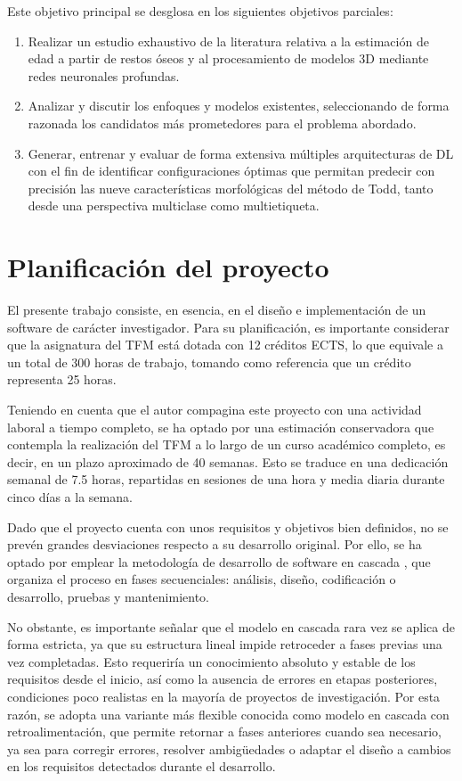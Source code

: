 Este objetivo principal se desglosa en los siguientes objetivos parciales:

\begin{enumerate}
    \item Realizar un estudio exhaustivo de la literatura relativa a la estimación de edad a partir de restos óseos y al procesamiento de modelos 3D mediante redes neuronales profundas.
    \item Analizar y discutir los enfoques y modelos existentes, seleccionando de forma razonada los candidatos más prometedores para el problema abordado.
    \item Generar, entrenar y evaluar de forma extensiva múltiples arquitecturas de DL con el fin de identificar configuraciones óptimas que permitan predecir con precisión las nueve características morfológicas del método de Todd, tanto desde una perspectiva multiclase como multietiqueta.
\end{enumerate}

\section{Planificación del proyecto}

El presente trabajo consiste, en esencia, en el diseño e implementación de un software de carácter investigador. Para su planificación, es importante considerar que la asignatura del TFM está dotada con 12 créditos ECTS, lo que equivale a un total de 300 horas de trabajo, tomando como referencia que un crédito representa 25 horas.

Teniendo en cuenta que el autor compagina este proyecto con una actividad laboral a tiempo completo, se ha optado por una estimación conservadora que contempla la realización del TFM a lo largo de un curso académico completo, es decir, en un plazo aproximado de 40 semanas. Esto se traduce en una dedicación semanal de 7.5 horas, repartidas en sesiones de una hora y media diaria durante cinco días a la semana.

Dado que el proyecto cuenta con unos requisitos y objetivos bien definidos, no se prevén grandes desviaciones respecto a su desarrollo original. Por ello, se ha optado por emplear la metodología de desarrollo de software en cascada \cite{pressman2005software}, que organiza el proceso en fases secuenciales: análisis, diseño, codificación o desarrollo, pruebas y mantenimiento.

No obstante, es importante señalar que el modelo en cascada rara vez se aplica de forma estricta, ya que su estructura lineal impide retroceder a fases previas una vez completadas. Esto requeriría un conocimiento absoluto y estable de los requisitos desde el inicio, así como la ausencia de errores en etapas posteriores, condiciones poco realistas en la mayoría de proyectos de investigación. Por esta razón, se adopta una variante más flexible conocida como modelo en cascada con retroalimentación, que permite retornar a fases anteriores cuando sea necesario, ya sea para corregir errores, resolver ambigüedades o adaptar el diseño a cambios en los requisitos detectados durante el desarrollo.

